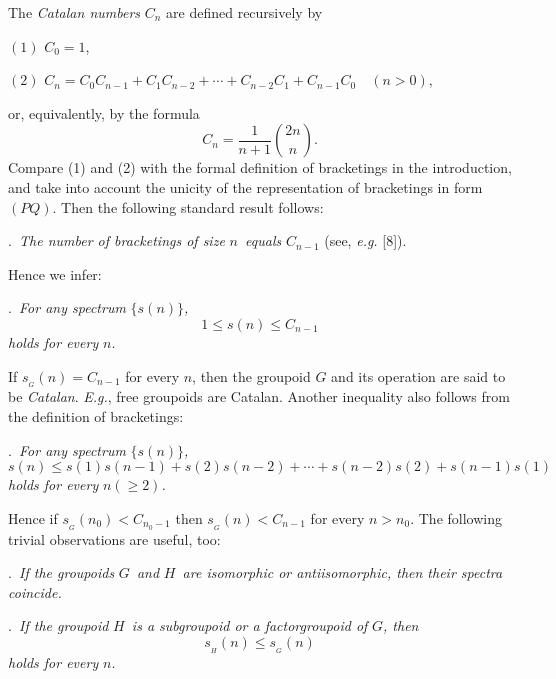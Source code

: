 \documentclass[a4paper,reqno]{amsart}\usepackage{amssymb,latexsym}
\theoremstyle{definition}
\theoremstyle{remark}
\numberwithin{equation}{section}
\numberwithin{theorem}{section}
\begin{document}
The \textit{Catalan numbers} $C_{n}$ are defined recursively by

\smallskip

\noindent$\left(  1\right)  $ $C_{0}=1$,

\noindent$\left(  2\right)  $ $C_{n}=C_{0}C_{n-1}+C_{1}C_{n-2}+\cdots
+C_{n-2}C_{1}+C_{n-1}C_{0}\quad(n>0)$,

\smallskip

\noindent or, equivalently, by the formula\[
C_{n}={\frac{1}{{n+1}}}{\binom{{2n}}{n}}.
\]
Compare (1) and (2) with the formal definition of bracketings in the
introduction, and take into account the unicity of the representation of
bracketings in form $(PQ)$. Then the following standard result follows:

\bigskip

.\textit{\ The number of bracketings of size }$n$\textit{\ equals
}$C_{n-1}$ (see, \textit{e.g.} [8]).

\smallskip

\noindent Hence we infer:

\bigskip

.\textit{\ For any spectrum }$\{s(n)\}$\textit{,}\[
1\leq s(n)\leq C_{n-1}\]
\textit{holds for every }$n$\textit{.}

\smallskip

If $s_{{}_{G}}(n)=C_{n-1}$ for every $n$, then the groupoid $G$ and its
operation are said to be \textit{Catalan}. \textit{E.g.}, free groupoids are
Catalan. Another inequality also follows from the definition of bracketings:

\bigskip

.\textit{\ For any spectrum }$\{s(n)\}$\textit{, }\[
s(n)\leq s(1)s(n-1)+s(2)s(n-2)+\cdots+s(n-2)s(2)+s(n-1)s(1)
\]
\textit{holds for every }$n(\geq2)$\textit{.}

\smallskip

Hence if $s_{{}_{G}}(n_{0})<C_{{n_{0}}-1}$ then $s_{{}_{G}}(n)<C_{n-1}$ for
every $n>n_{0}$. The following trivial observations are useful, too:

\bigskip

.\textit{\ If the groupoids }$G$\textit{\ and }$H$\textit{\ are
isomorphic or antiisomorphic, then their spectra coincide.}

\bigskip

.\textit{\ If the groupoid }$H$\textit{\ is a subgroupoid or a
factorgroupoid of }$G$\textit{, then }\[
s_{{}_{H}}(n)\leq s_{{}_{G}}(n)
\]
\textit{holds for every }$n$\textit{.}
\end{document}
